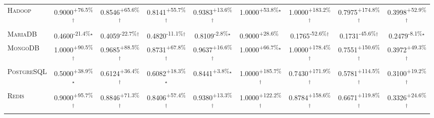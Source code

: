 \begin{table}[htbp]
\begin{tabular}{l|cccc|cccc}
\textsc{Hadoop} & \cellcolor{green!30}0.9000\textsuperscript{+76.5\%}$^\dagger$ & \cellcolor{green!30}0.8546\textsuperscript{+65.6\%}$^\dagger$ & \cellcolor{green!30}0.8141\textsuperscript{+55.7\%}$^\dagger$ & \cellcolor{green!30}0.9383\textsuperscript{+13.6\%}$^\dagger$ & \cellcolor{green!30}1.0000\textsuperscript{+53.8\%}$^\star$ & \cellcolor{green!30}1.0000\textsuperscript{+183.2\%}$^\dagger$ & \cellcolor{green!30}0.7975\textsuperscript{+174.8\%}$^\dagger$ & \cellcolor{green!30}0.3998\textsuperscript{+52.9\%}$^\dagger$ \\
\textsc{MariaDB} & \cellcolor{red!30}0.4600\textsuperscript{-21.4\%}$^\star$ & \cellcolor{red!30}0.4059\textsuperscript{-22.7\%}$^\dagger$ & \cellcolor{red!30}0.4820\textsuperscript{-11.1\%}$^\dagger$ & \cellcolor{red!30}0.8109\textsuperscript{-2.8\%}$^\star$ & \cellcolor{green!30}0.9000\textsuperscript{+28.6\%}$^{\,\,\,}$ & \cellcolor{red!30}0.1765\textsuperscript{-52.6\%}$^\dagger$ & \cellcolor{red!30}0.1731\textsuperscript{-45.6\%}$^\dagger$ & \cellcolor{red!30}0.2479\textsuperscript{-8.1\%}$^\star$ \\
\textsc{MongoDB} & \cellcolor{green!30}1.0000\textsuperscript{+90.5\%}$^\dagger$ & \cellcolor{green!30}0.9685\textsuperscript{+88.5\%}$^\dagger$ & \cellcolor{green!30}0.8731\textsuperscript{+67.8\%}$^\dagger$ & \cellcolor{green!30}0.9637\textsuperscript{+16.6\%}$^\dagger$ & \cellcolor{green!30}1.0000\textsuperscript{+66.7\%}$^\star$ & \cellcolor{green!30}1.0000\textsuperscript{+178.4\%}$^\dagger$ & \cellcolor{green!30}0.7551\textsuperscript{+150.6\%}$^\dagger$ & \cellcolor{green!30}0.3972\textsuperscript{+49.3\%}$^\dagger$ \\
\textsc{PostgreSQL} & \cellcolor{green!30}0.5000\textsuperscript{+38.9\%}$^\star$ & \cellcolor{green!30}0.6124\textsuperscript{+36.4\%}$^\dagger$ & \cellcolor{green!30}0.6082\textsuperscript{+18.3\%}$^\star$ & \cellcolor{green!30}0.8441\textsuperscript{+3.8\%}$^\star$ & \cellcolor{green!30}1.0000\textsuperscript{+185.7\%}$^\dagger$ & \cellcolor{green!30}0.7430\textsuperscript{+171.9\%}$^\dagger$ & \cellcolor{green!30}0.5781\textsuperscript{+114.5\%}$^\dagger$ & \cellcolor{green!30}0.3100\textsuperscript{+19.2\%}$^\dagger$ \\
\textsc{Redis} & \cellcolor{green!30}0.9000\textsuperscript{+95.7\%}$^\dagger$ & \cellcolor{green!30}0.8846\textsuperscript{+71.3\%}$^\dagger$ & \cellcolor{green!30}0.8406\textsuperscript{+57.4\%}$^\dagger$ & \cellcolor{green!30}0.9380\textsuperscript{+13.3\%}$^\dagger$ & \cellcolor{green!30}1.0000\textsuperscript{+122.2\%}$^\dagger$ & \cellcolor{green!30}0.8784\textsuperscript{+158.6\%}$^\dagger$ & \cellcolor{green!30}0.6671\textsuperscript{+119.8\%}$^\dagger$ & \cellcolor{green!30}0.3326\textsuperscript{+24.6\%}$^\dagger$ \\

\end{tabular}
\end{table}
